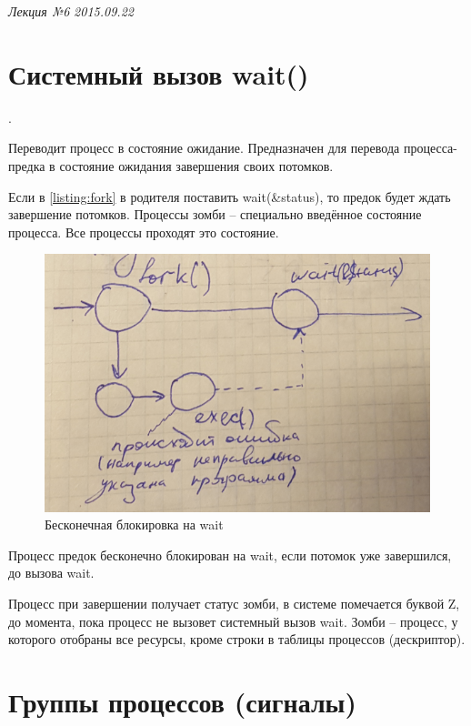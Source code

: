 \clearpage
\begin{flushright}
	\textit{Лекция №6}
	\textit{2015.09.22}
\end{flushright}

\section{Системный вызов wait()}.

Переводит процесс в состояние ожидание. Предназначен для перевода процесса-предка в состояние ожидания завершения своих потомков. 

Если в \ref{listing:fork} в родителя поставить wait(\&status), то предок будет ждать завершение потомков. 
Процессы зомби – специально введённое состояние процесса. Все процессы проходят это состояние. 

\begin{figure}[H]
	\centering
	\includegraphics[width=\textwidth]{pic/4.png}
	\caption{Бесконечная блокировка на wait}
\end{figure}

Процесс предок бесконечно блокирован на wait, если потомок уже завершился, до вызова wait.

Процесс при завершении получает статус зомби, в системе помечается буквой Z, до момента, пока процесс не вызовет системный вызов wait.  Зомби – процесс, у которого отобраны все ресурсы, кроме строки в таблицы процессов (дескриптор). 

\section{Группы процессов (сигналы)}

